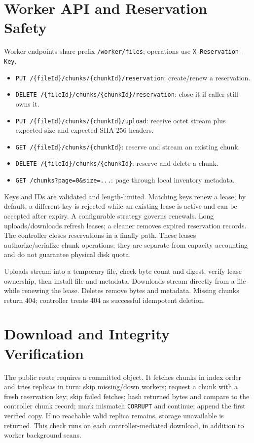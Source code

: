 \documentclass[11pt,a4paper]{article}
\begin{document}
\section{Worker API and Reservation Safety}
Worker endpoints share prefix \texttt{/worker/files}; operations use \texttt{X-Reservation-Key}.
\begin{itemize}
\item \texttt{PUT /\{fileId\}/chunks/\{chunkId\}/reservation}: create/renew a reservation.
\item \texttt{DELETE /\{fileId\}/chunks/\{chunkId\}/reservation}: close it if caller still owns it.
\item \texttt{PUT /\{fileId\}/chunks/\{chunkId\}/upload}: receive octet stream plus expected-size and expected-SHA-256 headers.
\item \texttt{GET /\{fileId\}/chunks/\{chunkId\}}: reserve and stream an existing chunk.
\item \texttt{DELETE /\{fileId\}/chunks/\{chunkId\}}: reserve and delete a chunk.
\item \texttt{GET /chunks?page=0\&size=...}: page through local inventory metadata.
\end{itemize}
Keys and IDs are validated and length-limited. Matching keys renew a lease; by default, a different key is rejected while an existing lease is active and can be accepted after expiry. A configurable strategy governs renewals. Long uploads/downloads refresh leases; a cleaner removes expired reservation records. The controller closes reservations in a finally path. These leases authorize/serialize chunk operations; they are separate from capacity accounting and do not guarantee physical disk quota.

Uploads stream into a temporary file, check byte count and digest, verify lease ownership, then install file and metadata. Downloads stream directly from a file while renewing the lease. Deletes remove bytes and metadata. Missing chunks return 404; controller treats 404 as successful idempotent deletion.

\section{Download and Integrity Verification}
The public route requires a committed object. It fetches chunks in index order and tries replicas in turn: skip missing/down workers; request a chunk with a fresh reservation key; skip failed fetches; hash returned bytes and compare to the controller chunk record; mark mismatch \texttt{CORRUPT} and continue; append the first verified copy. If no reachable valid replica remains, storage unavailable is returned. This check runs on each controller-mediated download, in addition to worker background scans.
\end{document}
